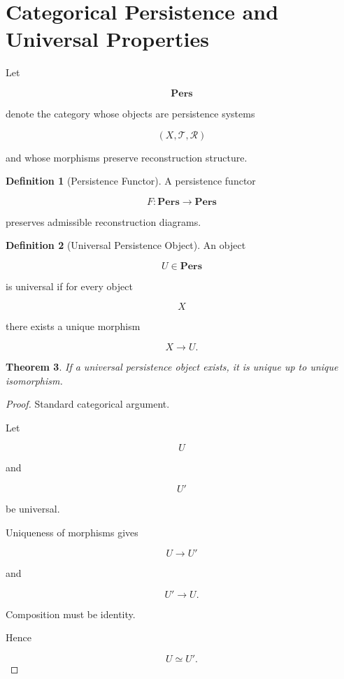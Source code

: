 \documentclass[12pt,oneside]{article}
\newtheorem{theorem}{Theorem}[section] \newtheorem{lemma}[theorem]{Lemma} \newtheorem{proposition}[theorem]{Proposition} \newtheorem{corollary}[theorem]{Corollary}
\theoremstyle{definition}
\newtheorem{definition}[theorem]{Definition} \newtheorem{axiom}[theorem]{Axiom} \newtheorem{remark}[theorem]{Remark} \newtheorem{example}[theorem]{Example}
\begin{document}
\section{Categorical Persistence and Universal Properties}

Let

\[
\mathbf{Pers}
\]

denote the category whose objects are persistence systems

\[
(X,\mathcal T,\mathcal R)
\]

and whose morphisms preserve reconstruction structure.

\begin{definition}[Persistence Functor]

A persistence functor

\[
F:
\mathbf{Pers}
\rightarrow
\mathbf{Pers}
\]

preserves admissible reconstruction diagrams.

\end{definition}

\begin{definition}[Universal Persistence Object]

An object

\[
U
\in
\mathbf{Pers}
\]

is universal if for every object

\[
X
\]

there exists a unique morphism

\[
X
\rightarrow
U.
\]

\end{definition}

\begin{theorem}

If a universal persistence object exists, it is unique up to unique isomorphism.

\end{theorem}

\begin{proof}

Standard categorical argument.

Let

\[
U
\]

and

\[
U'
\]

be universal.

Uniqueness of morphisms gives

\[
U
\to
U'
\]

and

\[
U'
\to
U.
\]

Composition must be identity.

Hence

\[
U
\simeq
U'.
\]

\end{proof}
\end{document}
